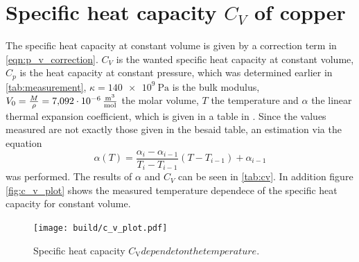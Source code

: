 \section{Specific heat capacity $C_V$ of copper}

The specific heat capacity at constant volume is given by a correction term in \autoref{eqn:p_v_correction}. $C_V$ is  
the wanted specific heat capacity at constant volume, $C_p$ is the heat capacity at constant pressure, which was determined earlier in 
\autoref{tab:measurement}, $\kappa = \qty{140e9}{\pascal}$ \cite{copper} is the bulk modulus, $V_0 = \frac{M}{\rho}= \qty{7.092e-6}{\frac{\meter^3}{\mol}} $\cite{copper} the molar volume, $T$ the temperature and $\alpha$ the linear thermal 
expansion coefficient, which is given in a table in \cite{v47}. Since the values measured are not exactly those given in the besaid table,
an estimation via the equation
\begin{equation}
    \alpha(T) = \frac{\alpha_i - \alpha_{i-1}}{T_i - T_{i-1}}\left(T - T_{i-1} \right) + \alpha_{i-1}
\end{equation}
was performed. The results of $\alpha$ and $C_V$ can be seen in \autoref{tab:cv}. In addition figure \ref{fig:c_v_plot} shows the measured temperature dependece of the specific heat capacity for constant volume.
\begin{figure}
    \centering
    \texttt{[image: build/c\_v\_plot.pdf]}
    \caption{Specific heat capacity $C_\mathrm{V} dependet on the temperature$.}
    \label{fig:c_v}
\end{figure}
